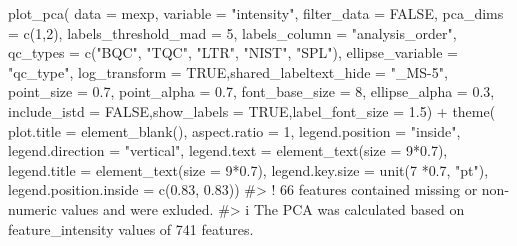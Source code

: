 \documentclass[
  letterpaper,
  DIV=11,
  numbers=noendperiod]{scrartcl}
\newenvironment{Shaded}{\begin{snugshade}}{\end{snugshade}}
\newcommand{\AttributeTok}[1]{\textcolor[rgb]{0.40,0.45,0.13}{#1}}
\newcommand{\CommentTok}[1]{\textcolor[rgb]{0.37,0.37,0.37}{#1}}
\newcommand{\ConstantTok}[1]{\textcolor[rgb]{0.56,0.35,0.01}{#1}}
\newcommand{\DecValTok}[1]{\textcolor[rgb]{0.68,0.00,0.00}{#1}}
\newcommand{\FloatTok}[1]{\textcolor[rgb]{0.68,0.00,0.00}{#1}}
\newcommand{\FunctionTok}[1]{\textcolor[rgb]{0.28,0.35,0.67}{#1}}
\newcommand{\NormalTok}[1]{\textcolor[rgb]{0.00,0.23,0.31}{#1}}
\newcommand{\SpecialCharTok}[1]{\textcolor[rgb]{0.37,0.37,0.37}{#1}}
\newcommand{\StringTok}[1]{\textcolor[rgb]{0.13,0.47,0.30}{#1}}
\begin{document}
\begin{Shaded}
\begin{Highlighting}[]
\FunctionTok{plot\_pca}\NormalTok{(}
  \AttributeTok{data =}\NormalTok{ mexp,}
  \AttributeTok{variable =} \StringTok{"intensity"}\NormalTok{,}
  \AttributeTok{filter\_data =} \ConstantTok{FALSE}\NormalTok{,}
  \AttributeTok{pca\_dims =} \FunctionTok{c}\NormalTok{(}\DecValTok{1}\NormalTok{,}\DecValTok{2}\NormalTok{),}
  \AttributeTok{labels\_threshold\_mad =} \DecValTok{5}\NormalTok{,}
  \AttributeTok{labels\_column =} \StringTok{"analysis\_order"}\NormalTok{,}
  \AttributeTok{qc\_types =} \FunctionTok{c}\NormalTok{(}\StringTok{"BQC"}\NormalTok{, }\StringTok{"TQC"}\NormalTok{, }\StringTok{"LTR"}\NormalTok{, }\StringTok{"NIST"}\NormalTok{, }\StringTok{"SPL"}\NormalTok{),}
  \AttributeTok{ellipse\_variable =} \StringTok{"qc\_type"}\NormalTok{,}
  \AttributeTok{log\_transform =} \ConstantTok{TRUE}\NormalTok{,}\AttributeTok{shared\_labeltext\_hide =} \StringTok{"\_MS{-}5"}\NormalTok{,}
  \AttributeTok{point\_size =} \FloatTok{0.7}\NormalTok{, }\AttributeTok{point\_alpha =} \FloatTok{0.7}\NormalTok{, }\AttributeTok{font\_base\_size =} \DecValTok{8}\NormalTok{, }\AttributeTok{ellipse\_alpha =} \FloatTok{0.3}\NormalTok{,}
  \AttributeTok{include\_istd =} \ConstantTok{FALSE}\NormalTok{,}\AttributeTok{show\_labels =} \ConstantTok{TRUE}\NormalTok{,}\AttributeTok{label\_font\_size =} \FloatTok{1.5}\NormalTok{)   }\SpecialCharTok{+} \FunctionTok{theme}\NormalTok{(}
    \AttributeTok{plot.title =} \FunctionTok{element\_blank}\NormalTok{(),}
    \AttributeTok{aspect.ratio =} \DecValTok{1}\NormalTok{,}
        \AttributeTok{legend.position =} \StringTok{"inside"}\NormalTok{,}
      \AttributeTok{legend.direction =} \StringTok{"vertical"}\NormalTok{, }
      \AttributeTok{legend.text =} \FunctionTok{element\_text}\NormalTok{(}\AttributeTok{size =} \DecValTok{9}\SpecialCharTok{*}\FloatTok{0.7}\NormalTok{),}
      \AttributeTok{legend.title =} \FunctionTok{element\_text}\NormalTok{(}\AttributeTok{size =} \DecValTok{9}\SpecialCharTok{*}\FloatTok{0.7}\NormalTok{),}
      \AttributeTok{legend.key.size =} \FunctionTok{unit}\NormalTok{(}\DecValTok{7} \SpecialCharTok{*}\FloatTok{0.7}\NormalTok{, }\StringTok{"pt"}\NormalTok{),}
      \AttributeTok{legend.position.inside =} \FunctionTok{c}\NormalTok{(}\FloatTok{0.83}\NormalTok{, }\FloatTok{0.83}\NormalTok{)) }
\CommentTok{\#\textgreater{} ! 66 features contained missing or non{-}numeric values and were exluded.}
\CommentTok{\#\textgreater{} i The PCA was calculated based on \textasciigrave{}feature\_intensity\textasciigrave{} values of 741 features.}
\end{Highlighting}
\end{Shaded}
\end{document}
